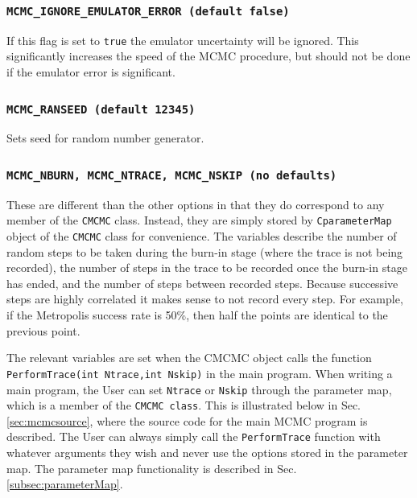 \documentclass[UserManual.tex]{subfiles}
\begin{document}
\subsubsection{{\tt MCMC\_IGNORE\_EMULATOR\_ERROR (default false)}}
If this flag is set to {\tt true} the emulator uncertainty will be ignored. This significantly increases the speed of the MCMC procedure, but should not be done if the emulator error is significant.
\subsubsection{{\tt MCMC\_RANSEED (default 12345)}}
Sets seed for random number generator.
\subsubsection{{\tt MCMC\_NBURN, MCMC\_NTRACE, MCMC\_NSKIP (no defaults)}}
These are different than the other options in that they do correspond to any member of the {\tt CMCMC} class. Instead, they are simply stored by {\tt CparameterMap} object of the {\tt CMCMC} class for convenience. The variables describe the number of random steps to be taken during the burn-in stage (where the trace is not being recorded), the number of steps in the trace to be recorded once the burn-in stage has ended, and the number of steps between recorded steps. Because successive steps are highly correlated it makes sense to not record every step. For example, if the Metropolis success rate is 50\%, then half the points are identical to the previous point.

The relevant variables are set when the CMCMC object calls the function {\tt PerformTrace(int Ntrace,int Nskip)} in the main program. When writing a main program, the User can set {\tt Ntrace} or {\tt Nskip} through the parameter map, which is a member of the {\tt CMCMC class}. This is illustrated below in Sec. \ref{sec:mcmcsource}, where the source code for the main MCMC program is described. The User can always simply call the {\tt PerformTrace} function with whatever arguments they wish and never use the options stored in the parameter map. The parameter map functionality is described in Sec. \ref{subsec:parameterMap}.
\end{document}
